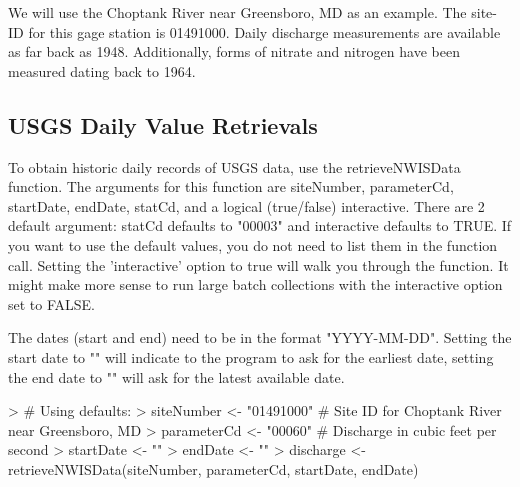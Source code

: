 \documentclass[a4paper,11pt]{article}
\begin{document}
We will use the Choptank River near Greensboro, MD as an example.  The site-ID for this gage station is 01491000. Daily discharge measurements are available as far back as 1948.  Additionally, forms of nitrate and nitrogen have been measured dating back to 1964.

\subsection{USGS Daily Value Retrievals}
To obtain historic daily records of USGS data, use the retrieveNWISData function. The arguments for this function are siteNumber, parameterCd, startDate, endDate, statCd, and a logical (true/false) interactive. There are 2 default argument: statCd defaults to "00003" and interactive defaults to TRUE.  If you want to use the default values, you do not need to list them in the function call. Setting the 'interactive' option to true will walk you through the function. It might make more sense to run large batch collections with the interactive option set to FALSE. 

The dates (start and end) need to be in the format "YYYY-MM-DD".  Setting the start date to "" will indicate to the program to ask for the earliest date, setting the end date to "" will ask for the latest available date.

\begin{Schunk}
\begin{Sinput}
> # Using defaults:
> siteNumber <- "01491000" # Site ID for Choptank River near Greensboro, MD
> parameterCd <- "00060"  # Discharge in cubic feet per second
> startDate <- ""
> endDate <- ""
> discharge <- retrieveNWISData(siteNumber, parameterCd, startDate, endDate)
\end{Sinput}
\end{Schunk}
\end{document}
